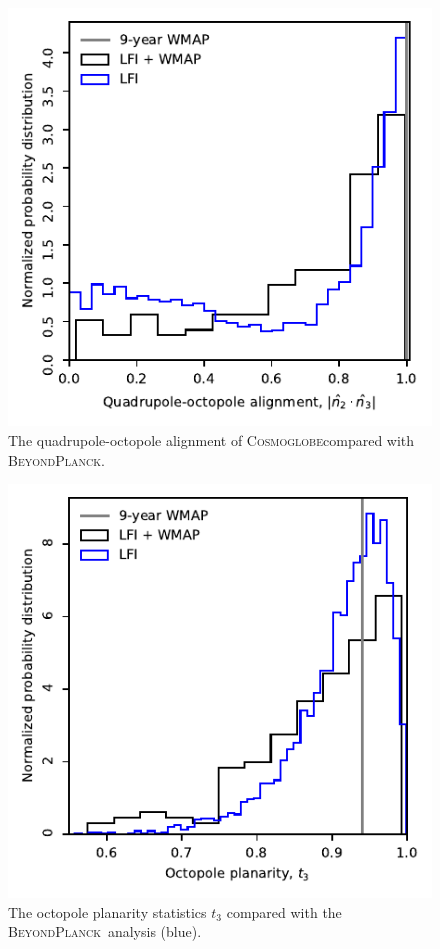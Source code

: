 \documentclass[twocolumn]{../../common/aa}
\newcommand{\BP}{\textsc{BeyondPlanck}}
\newcommand{\Cosmoglobe}{\textsc{Cosmoglobe}}
\begin{document}
\begin{figure}
	\includegraphics[width=\columnwidth]{figures/WMAP_n_2_n_3.pdf}
	\caption{The quadrupole-octopole alignment of \Cosmoglobe compared with \BP.}
\end{figure}

\begin{figure}
	\includegraphics[width=\columnwidth]{figures/WMAP_t_3.pdf}
	\caption{The octopole planarity statistics $t_3$ compared with the \BP\ analysis (blue).}
\end{figure}
\end{document}
